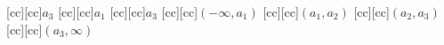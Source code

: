 [cc][cc]{$a_3$}
[cc][cc]{$a_1$}
[cc][cc]{$a_3$}
[cc][cc]{$(-\infty, a_1)$}
[cc][cc]{$(a_1, a_2)$}
[cc][cc]{$(a_2, a_3)$}
[cc][cc]{$(a_3, \infty)$}
